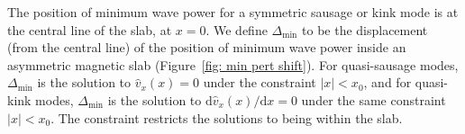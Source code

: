 \documentclass[namedreferences]{solarphysics}
\numberwithin{equation}{section}
\begin{document}
\begin{article}
The position of minimum wave power for a symmetric sausage or kink mode is at the central line of the slab, at $x=0$. We define $\Delta_\textrm{min}$ to be the displacement (from the central line) of the position of minimum wave power inside an asymmetric magnetic slab (Figure~\ref{fig: min pert shift}). For quasi-sausage modes, $\Delta_\textrm{min}$ is the solution to $\widehat{v}_x(x) = 0$ under the constraint $|x| < x_0$, and for quasi-kink modes, $\Delta_\textrm{min}$ is the solution to $\textrm{d}\widehat{v}_x (x) / \textrm{d}x = 0$ under the same constraint $|x| < x_0$. The constraint restricts the solutions to being within the slab. 

\begin{figure}
\end{figure}
\end{article}
\end{document}
